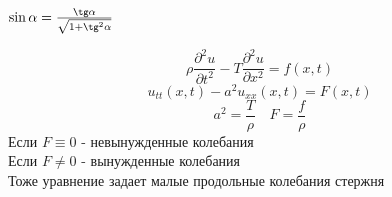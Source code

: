 \documentclass[a4paper]{article}
\begin{document}
$ \sin\alpha = \frac{\tg\alpha}{\sqrt{1+\tg^2\alpha}} $ 

\begin{equation}
    \rho \frac{\partial ^2 u}{\partial t^2} - T\frac{\partial ^2 u}{\partial x^2} = f(x,t)
\end{equation}
\begin{equation}
    u_{tt}(x,t) - a^2 u_{xx}(x,t) = F(x,t)
\end{equation}
\[
    a^2 = \frac{T}{\rho} \quad F = \frac{f}{\rho} 
\]
Если $ F \equiv 0 $ - невынужденные колебания \\
Если $ F \neq 0 $ - вынужденные колебания \\

Тоже уравнение задает малые продольные колебания стержня \\
\end{document}
